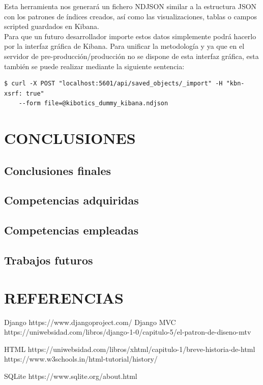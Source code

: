 \documentclass[11pt,a4paper]{book}
\begin{document}
			Esta herramienta nos generará un fichero NDJSON similar a la estructura JSON con los patrones de índices creados, así como las visualizaciones, tablas o campos scripted guardados en Kibana.\\
			
			Para que un futuro desarrollador importe estos datos simplemente podrá hacerlo por la interfaz gráfica de Kibana. Para unificar la metodología y ya que en el servidor de pre-producción/producción no se dispone de esta interfaz gráfica, esta también se puede realizar mediante la siguiente sentencia:\\
			

			
			\begin{Verbatim}[tabsize=4]
$ curl -X POST "localhost:5601/api/saved_objects/_import" -H "kbn-xsrf: true" 
	--form file=@kibotics_dummy_kibana.ndjson
			\end{Verbatim}
			
			


	\chapter{CONCLUSIONES}
		\section{Conclusiones finales}
		\section{Competencias adquiridas}
		\section{Competencias empleadas}
		\section{Trabajos futuros}
	\chapter{REFERENCIAS}
	Django
https://www.djangoproject.com/
	Django MVC
https://uniwebsidad.com/libros/django-1-0/capitulo-5/el-patron-de-diseno-mtv

	HTML 
	https://uniwebsidad.com/libros/xhtml/capitulo-1/breve-historia-de-html
	https://www.w3schools.in/html-tutorial/history/
	
	SQLite
	https://www.sqlite.org/about.html
	
\end{document}
